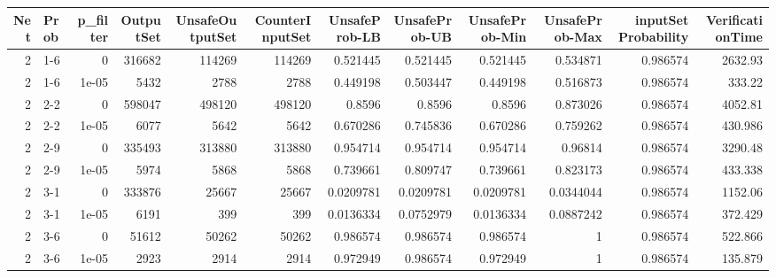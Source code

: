 \begin{tabular}{rlrrrrrrrrrr}
\hline
   Net & Prob   &   p\_filter &   OutputSet &   UnsafeOutputSet &   CounterInputSet &   UnsafeProb-LB &   UnsafeProb-UB &   UnsafeProb-Min &   UnsafeProb-Max &   inputSet Probability &   VerificationTime \\
\hline
     2 & 1-6    &      0     &      316682 &            114269 &            114269 &       0.521445  &       0.521445  &        0.521445  &        0.534871  &               0.986574 &         2632.93    \\
     2 & 1-6    &      1e-05 &        5432 &              2788 &              2788 &       0.449198  &       0.503447  &        0.449198  &        0.516873  &               0.986574 &          333.22    \\
     2 & 2-2    &      0     &      598047 &            498120 &            498120 &       0.8596    &       0.8596    &        0.8596    &        0.873026  &               0.986574 &         4052.81    \\
     2 & 2-2    &      1e-05 &        6077 &              5642 &              5642 &       0.670286  &       0.745836  &        0.670286  &        0.759262  &               0.986574 &          430.986   \\
     2 & 2-9    &      0     &      335493 &            313880 &            313880 &       0.954714  &       0.954714  &        0.954714  &        0.96814   &               0.986574 &         3290.48    \\
     2 & 2-9    &      1e-05 &        5974 &              5868 &              5868 &       0.739661  &       0.809747  &        0.739661  &        0.823173  &               0.986574 &          433.338   \\
     2 & 3-1    &      0     &      333876 &             25667 &             25667 &       0.0209781 &       0.0209781 &        0.0209781 &        0.0344044 &               0.986574 &         1152.06    \\
     2 & 3-1    &      1e-05 &        6191 &               399 &               399 &       0.0136334 &       0.0752979 &        0.0136334 &        0.0887242 &               0.986574 &          372.429   \\
     2 & 3-6    &      0     &       51612 &             50262 &             50262 &       0.986574  &       0.986574  &        0.986574  &        1         &               0.986574 &          522.866   \\
     2 & 3-6    &      1e-05 &        2923 &              2914 &              2914 &       0.972949  &       0.986574  &        0.972949  &        1         &               0.986574 &          135.879   \\

\end{tabular}
